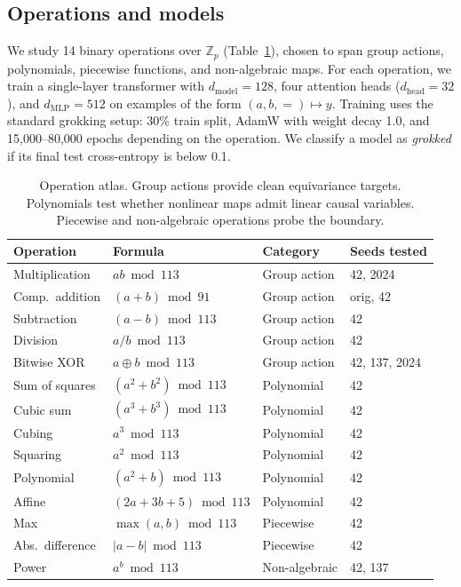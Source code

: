 \documentclass{article}
\newcommand{\Z}{\mathbb{Z}}
\begin{document}
\subsection{Operations and models}

We study 14 binary operations over $\Z_p$ (Table~\ref{tab:operations}), chosen
to span group actions, polynomials, piecewise functions, and non-algebraic maps.
For each operation, we train a single-layer transformer with
$d_\text{model} = 128$, four attention heads ($d_\text{head} = 32$), and
$d_\text{MLP} = 512$ on examples of the form $(a, b, {=}) \mapsto y$. Training
uses the standard grokking setup: 30\% train split, AdamW with weight decay 1.0,
and 15{,}000--80{,}000 epochs depending on the operation. We classify a model as
\emph{grokked} if its final test cross-entropy is below 0.1.

\begin{table}[t]
\centering
\small
\begin{tabular}{llll}
\toprule
Operation & Formula & Category & Seeds tested \\
\midrule
Multiplication & $ab \bmod 113$ & Group action & 42, 2024 \\
Comp.\ addition & $(a{+}b) \bmod 91$ & Group action & orig, 42 \\
Subtraction & $(a{-}b) \bmod 113$ & Group action & 42 \\
Division & $a/b \bmod 113$ & Group action & 42 \\
Bitwise XOR & $a \oplus b \bmod 113$ & Group action & 42, 137, 2024 \\
\midrule
Sum of squares & $(a^2{+}b^2) \bmod 113$ & Polynomial & 42 \\
Cubic sum & $(a^3{+}b^3) \bmod 113$ & Polynomial & 42 \\
Cubing & $a^3 \bmod 113$ & Polynomial & 42 \\
Squaring & $a^2 \bmod 113$ & Polynomial & 42 \\
Polynomial & $(a^2{+}b) \bmod 113$ & Polynomial & 42 \\
Affine & $(2a{+}3b{+}5) \bmod 113$ & Polynomial & 42 \\
\midrule
Max & $\max(a,b) \bmod 113$ & Piecewise & 42 \\
Abs.\ difference & $|a{-}b| \bmod 113$ & Piecewise & 42 \\
Power & $a^b \bmod 113$ & Non-algebraic & 42, 137 \\
\bottomrule
\end{tabular}
\caption{Operation atlas. Group actions provide clean equivariance targets.
Polynomials test whether nonlinear maps admit linear causal variables. Piecewise
and non-algebraic operations probe the boundary.}
\label{tab:operations}
\end{table}
\end{document}
